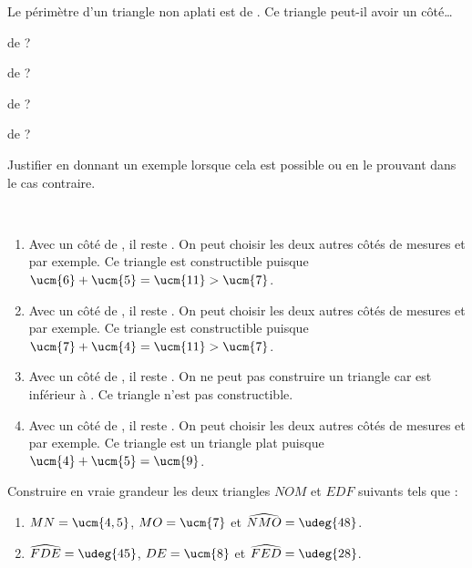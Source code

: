 \begin{colonne*exercice}
\begin{exercice} %
   Le périmètre d'un triangle non aplati est de . Ce triangle peut-il avoir un côté\dots
   \begin{colenumerate}{2}
      \item de  ?
      \item de  ?
      \item de  ?
      \item de  ?
   \end{colenumerate}
   Justifier en donnant un exemple lorsque cela est possible ou en le prouvant dans le cas contraire.
\end{exercice}

\begin{corrige}
   \ \\ [-5mm]
   \begin{enumerate}
      \item Avec un côté de , il reste . On peut choisir les deux autres côtés de mesures  et  par exemple. {\blue Ce triangle est  constructible} puisque $\ucm{6}+\ucm{5} =\ucm{11} >\ucm{7}$. \smallskip
      \item Avec un côté de , il reste . On peut choisir les deux autres côtés de mesures  et  par exemple. {\blue Ce triangle est constructible} puisque $\ucm{7}+\ucm{4} =\ucm{11} >\ucm{7}$. \smallskip
      \item Avec un côté de , il reste . On ne peut pas construire un triangle car  est inférieur à . {\blue Ce triangle n'est pas constructible}. \smallskip
      \item Avec un côté de , il reste . On peut choisir les deux autres côtés de mesures  et  par exemple. {\blue Ce triangle est un triangle plat} puisque $\ucm{4}+\ucm{5} =\ucm{9}$.
   \end{enumerate}
\end{corrige}

\medskip


\begin{exercice} %
   Construire en vraie grandeur les deux triangles $NOM$ et $EDF$ suivants tels que :
   \begin{enumerate}
      \item $MN =\ucm{4,5}$, $MO =\ucm{7}$ et $\widehat{NMO} =\udeg{48}$.
      \item $\widehat{FDE} =\udeg{45}$, $DE =\ucm{8}$ et $\widehat{FED} =\udeg{28}$.
   \end{enumerate}
\end{exercice}


\end{colonne*exercice}
